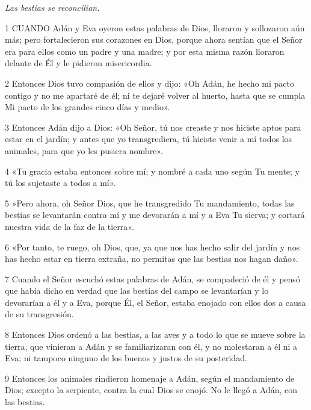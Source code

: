\par \textit{Las bestias se reconcilian.}

\par 1 CUANDO Adán y Eva oyeron estas palabras de Dios, lloraron y sollozaron aún más; pero fortalecieron sus corazones en Dios, porque ahora sentían que el Señor era para ellos como un padre y una madre; y por esta misma razón lloraron delante de Él y le pidieron misericordia.

\par 2 Entonces Dios tuvo compasión de ellos y dijo: «Oh Adán, he hecho mi pacto contigo y no me apartaré de él; ni te dejaré volver al huerto, hasta que se cumpla Mi pacto de los grandes cinco días y medio».

\par 3 Entonces Adán dijo a Dios: «Oh Señor, tú nos creaste y nos hiciste aptos para estar en el jardín; y antes que yo transgrediera, tú hiciste venir a mí todos los animales, para que yo les pusiera nombre».

\par 4 «Tu gracia estaba entonces sobre mí; y nombré a cada uno según Tu mente; y tú los sujetaste a todos a mí».

\par 5 »Pero ahora, oh Señor Dios, que he transgredido Tu mandamiento, todas las bestias se levantarán contra mí y me devorarán a mí y a Eva Tu sierva; y cortará nuestra vida de la faz de la tierra».

\par 6 «Por tanto, te ruego, oh Dios, que, ya que nos has hecho salir del jardín y nos has hecho estar en tierra extraña, no permitas que las bestias nos hagan daño».

\par 7 Cuando el Señor escuchó estas palabras de Adán, se compadeció de él y pensó que había dicho en verdad que las bestias del campo se levantarían y lo devorarían a él y a Eva, porque Él, el Señor, estaba enojado con ellos dos a causa de su transgresión.

\par 8 Entonces Dios ordenó a las bestias, a las aves y a todo lo que se mueve sobre la tierra, que vinieran a Adán y se familiarizaran con él, y no molestaran a él ni a Eva; ni tampoco ninguno de los buenos y justos de su posteridad.

\par 9 Entonces los animales rindieron homenaje a Adán, según el mandamiento de Dios; excepto la serpiente, contra la cual Dios se enojó. No le llegó a Adán, con las bestias.

